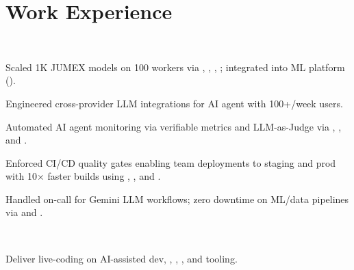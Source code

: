 \documentclass{tex/deedy-resume-openfont}
\begin{document}
\hfill
\begin{minipage}[t]{0.67\textwidth} 


\section{Work Experience}
\\
\vspace{\topsep}
\begin{tightemize}
    \item Scaled 1K JUMEX models on 100  workers via , , , ; integrated into ML platform ().
    \item Engineered cross-provider LLM integrations for AI agent with 100+/week users.
    \item Automated AI agent monitoring via verifiable metrics and LLM-as-Judge via , , and .
    \item Enforced CI/CD quality gates enabling team deployments to staging and prod with 10$\times$ faster builds using , , and .
    \item Handled on-call for Gemini LLM workflows; zero downtime on ML/data pipelines via  and .
\end{tightemize}
\sectionsep

\\
\begin{tightemize}
    \item Deliver live-coding on AI-assisted dev, , , , and tooling.
\end{tightemize}
\sectionsep


\end{minipage}
\end{document}
